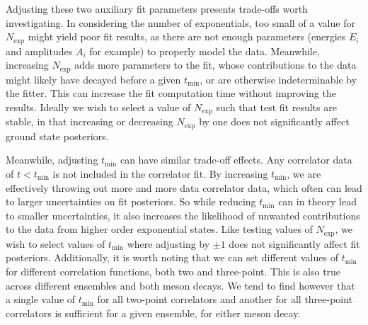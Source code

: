 Adjusting these two auxiliary fit parameters presents trade-offs worth investigating.  In considering the number of exponentials, too small of a value for $N_\mathrm{exp}$ might yield poor fit results, as there are not enough parameters (energies $E_i$ and amplitudes $A_i$ for example) to properly model the data.  Meanwhile, increasing $N_\mathrm{exp}$ adds more parameters to the fit, whose contributions to the data might likely have decayed before a given $t_\mathrm{min}$, or are otherwise indeterminable by the fitter.  This can increase the fit computation time without improving the results. Ideally we wish to select a value of $N_\mathrm{exp}$ such that test fit results are stable, in that increasing or decreasing $N_\mathrm{exp}$ by one does not significantly affect ground state posteriors.

Meanwhile, adjusting $t_\mathrm{min}$ can have similar trade-off effects.  Any correlator data of $t<t_\mathrm{min}$ is not included in the correlator fit.  By increasing $t_\mathrm{min}$, we are effectively throwing out more and more data correlator data, which often can lead to larger uncertainties on fit posteriors.  So while reducing $t_\mathrm{min}$ can in theory lead to smaller uncertainties, it also increases the likelihood of unwanted contributions to the data from higher order exponential states.  Like testing values of $N_\mathrm{exp}$, we wish to select values of $t_\mathrm{min}$ where adjusting by $\pm1$ does not significantly affect fit posteriors.  Additionally, it is worth noting that we can set different values of $t_\mathrm{min}$ for different correlation functions, both two and three-point.  This is also true across different ensembles and both meson decays.  We tend to find however that a single value of $t_\mathrm{min}$ for all two-point correlators and another for all three-point correlators is sufficient for a given ensemble, for either meson decay.  

